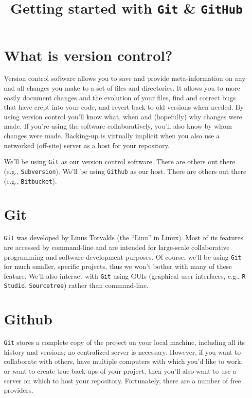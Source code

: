 \documentclass[12pt,letterpaper]{article}
\author{}
\title{Getting started with \texttt{Git} \& \texttt{GitHub}}
\date{}
\begin{document}
\maketitle

\tableofcontents

\pagebreak


\section{What is version control?}
Version control software allows you to save and provide meta-information on any and all changes you make to a set of files and directories.
It allows you to more easily document changes and the evolution of your files, find and correct bugs that have crept into your code, and revert back to old versions when needed.
By using version control you'll know what, when and (hopefully) why changes were made.
If you're using the software collaboratively, you'll also know by whom changes were made.
Backing-up is virtually implicit when you also use a networked (off-site) server as a host for your repository.

We'll be using \texttt{Git} as our version control software.
There are others out there (e.g., \texttt{Subversion}).
We'll be using \texttt{Github} as our host.
There are others out there (e.g., \texttt{Bitbucket}).

\section{Git}
\texttt{Git} was developed by Linus Torvalds (the ``Linu'' in Linux).
Most of its features are accessed by command-line and are intended for large-scale collaborative programming and software development purposes.
Of course, we'll be using \texttt{Git} for much smaller, specific projects, thus we won't bother with many of these feature.
We'll also interact with \texttt{Git} using GUIs (graphical user interfaces, e.g., \texttt{R-Studio}, \texttt{Sourcetree}) rather than command-line.


\section{Github}
\texttt{Git} stores a complete copy of the project on your local machine, including all its history and versions; no centralized server is necessary.
However, if you want to collaborate with others, have multiple computers with which you'd like to work, or want to create true back-ups of your project, then you'll also want to use a server on which to host your repository.
Fortunately, there are a number of free providers.
\end{document}
